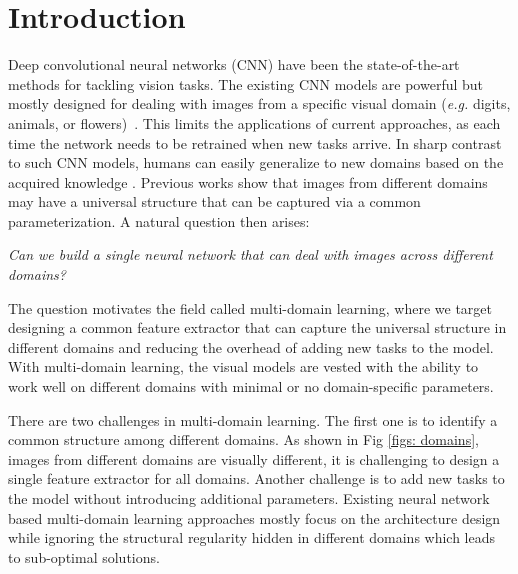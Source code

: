 \documentclass[letterpaper]{article} \usepackage{aaai19}  \usepackage{times}  \usepackage{helvet}  \usepackage{courier}  \usepackage{url}  \usepackage{graphicx}  \usepackage{amssymb}
\begin{document}
\section{Introduction}
Deep convolutional neural networks (CNN) \cite{krizhevsky2012imagenet,he2016deep} have been the state-of-the-art methods for tackling vision tasks. The existing CNN models are powerful but mostly designed for dealing with images from a specific visual domain ({\it e.g.} digits, animals, or flowers)~\cite{Li_2018_ECCV,Gan_2017_ICCV,long2018multimodal}. This limits the applications of current approaches, as each time the network needs to be retrained when new tasks arrive. In sharp contrast to such CNN models, humans can easily generalize to new domains based on the acquired knowledge \cite{cichon2015branch,hayashi2015labelling,kirkpatrick2017overcoming,li2017learning}. Previous works \cite{bilen2017universal,rebuffi18efficient} show that images from different domains may have a universal structure that can be captured via a common parameterization. A natural question then arises:
\begin{center}
    \textit{Can we build a single neural network that can deal with images across different domains?}
\end{center}

The question motivates the field called multi-domain learning, where we target designing a common feature extractor that can capture the universal structure in different domains and reducing the overhead of adding new tasks to the model. With multi-domain learning, the visual models are vested with the ability to work well on different domains with minimal or no domain-specific parameters. 

There are two challenges in multi-domain learning. The first one is to identify a common structure among different domains. As shown in Fig \ref{figs: domains}, images from different domains are visually different, it is challenging to design a single feature extractor for all domains. Another challenge is to add new tasks to the model without introducing additional parameters. Existing neural network based multi-domain learning approaches \cite{bilen2017universal,rebuffi2017learning,rebuffi18efficient,rosenfeld2017incremental} mostly focus on the architecture design while ignoring the structural regularity hidden in different domains which leads to sub-optimal solutions.
\end{document}
